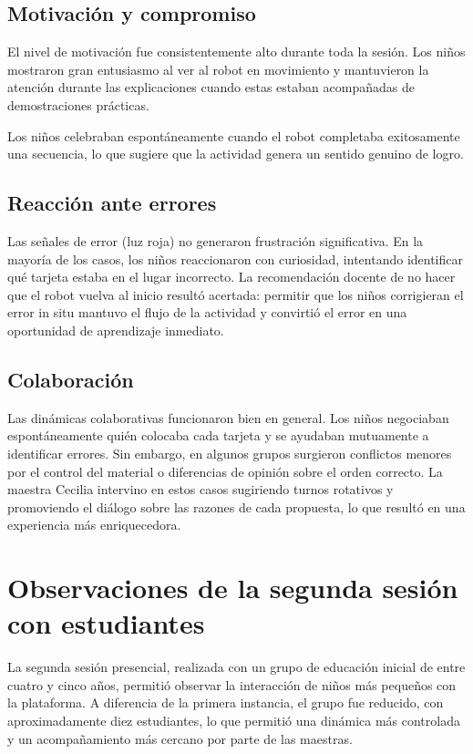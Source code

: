 \documentclass{prgrado}
\begin{document}
\subsection{Motivación y compromiso}
El nivel de motivación fue consistentemente alto durante toda la sesión. Los niños mostraron gran entusiasmo al ver al robot en movimiento y mantuvieron la atención durante las explicaciones cuando estas estaban acompañadas de demostraciones prácticas.

Los niños celebraban espontáneamente cuando el robot completaba exitosamente una secuencia, lo que sugiere que la actividad genera un sentido genuino de logro.
\subsection{Reacción ante errores}
Las señales de error (luz roja) no generaron frustración significativa. En la mayoría de los casos, los niños reaccionaron con curiosidad, intentando identificar qué tarjeta estaba en el lugar incorrecto. La recomendación docente de no hacer que el robot vuelva al inicio resultó acertada: permitir que los niños corrigieran el error in situ mantuvo el flujo de la actividad y convirtió el error en una oportunidad de aprendizaje inmediato.
\subsection{Colaboración}
Las dinámicas colaborativas funcionaron bien en general. Los niños negociaban espontáneamente quién colocaba cada tarjeta y se ayudaban mutuamente a identificar errores. Sin embargo, en algunos grupos surgieron conflictos menores por el control del material o diferencias de opinión sobre el orden correcto.
La maestra Cecilia intervino en estos casos sugiriendo turnos rotativos y promoviendo el diálogo sobre las razones de cada propuesta, lo que resultó en una experiencia más enriquecedora.

\section{Observaciones de la segunda sesión con estudiantes}
La segunda sesión presencial, realizada con un grupo de educación inicial de entre cuatro y cinco años, permitió observar la interacción de niños más pequeños con la plataforma. A diferencia de la primera instancia, el grupo fue reducido, con aproximadamente diez estudiantes, lo que permitió una dinámica más controlada y un acompañamiento más cercano por parte de las maestras.
\end{document}
